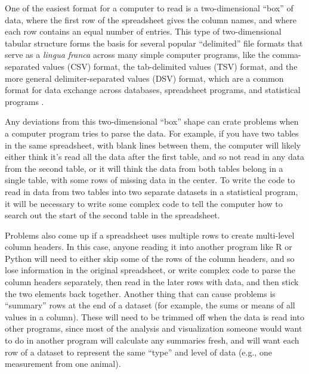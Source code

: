 \documentclass[]{tufte-book}
\begin{document}
One of the easiest format for a computer to read is a two-dimensional
``box'' of data, where the first row of the spreadsheet gives the column names,
and where each row contains an equal number of entries. This type of
two-dimensional tabular structure forms the basis for several popular
``delimited'' file formats that serve as a \emph{lingua franca} across many simple
computer programs, like the comma-separated values (CSV) format, the
tab-delimited values (TSV) format, and the more general delimiter-separated
values (DSV) format, which are a common format for data exchange across
databases, spreadsheet programs, and statistical programs \citep{janssens2014data, raymond2003art, buffalo2015bioinformatics}.

Any deviations from this two-dimensional ``box'' shape can crate problems
when a computer program tries to parse the data. For example, if
you have two tables in the same spreadsheet, with blank lines between them, the
computer will likely either think it's read all the data after the first table,
and so not read in any data from the second table, or it will think the data
from both tables belong in a single table, with some rows of missing data in the
center. To write the code to read in data from two tables into two separate
datasets in a statistical program, it will be necessary to write some complex
code to tell the computer how to search out the start of the second table in the
spreadsheet.

Problems also come up if a spreadsheet uses multiple rows to create multi-level
column headers. In this case, anyone reading it into another program like R or
Python will need to either skip some of the rows of the column headers, and so
lose information in the original spreadsheet, or write complex code to parse the
column headers separately, then read in the later rows with data, and then stick
the two elements back together. Another thing that can cause problems is
``summary'' rows at the end of a dataset (for example, the sums or means of all
values in a column). These will need to be trimmed off when the data is read
into other programs, since most of the analysis and visualization someone would
want to do in another program will calculate any summaries fresh, and will want
each row of a dataset to represent the same ``type'' and level of data (e.g., one
measurement from one animal).
\end{document}
